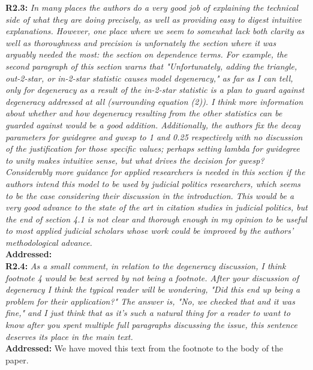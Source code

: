 \documentclass[a4paper,11pt]{texMemo}
\begin{document}
\noindent \textbf{R2.3:} \emph{ In many places the authors do a very good job of explaining the technical side of what they are doing precisely, as well as providing easy to digest intuitive explanations. However, one place where we seem to somewhat lack both clarity as well as thoroughness and precision is unfornately the section where it was arguably needed the most: the section on dependence terms. For example, the second paragraph of this section warns that "Unfortunately, adding the triangle, out-2-star, or in-2-star statistic causes model degeneracy," as far as I can tell, only for degeneracy as a result of the in-2-star statistic is a plan to guard against degeneracy addressed at all (surrounding equation (2)). I think more information about whether and how degeneracy resulting from the other statistics can be guarded against would be a good addition. Additionally, the authors fix the decay parameters for gwidegree and gwesp to 1 and 0.25 respectively with no discussion of the justification for those specific values; perhaps setting lambda for gwidegree to unity makes intuitive sense, but what drives the decision for gwesp? Considerably more guidance for applied researchers is needed in this section if the authors intend this model to be used by judicial politics researchers, which seems to be the case considering their discussion in the introduction. This would be a very good advance to the state of the art in citation studies in judicial politics, but the end of section 4.1 is not clear and thorough enough in my opinion to be useful to most applied judicial scholars whose work could be improved by the authors' methodological advance.}\\

\noindent \textbf{Addressed:}  \\

\noindent \textbf{R2.4:} \emph{ As a small comment, in relation to the degeneracy discussion, I think footnote 4 would be best served by not being a footnote. After your discussion of degeneracy I think the typical reader will be wondering, "Did this end up being a problem for their application?" The answer is, "No, we checked that and it was fine," and I just think that as it's such a natural thing for a reader to want to know after you spent multiple full paragraphs discussing the issue, this sentence deserves its place in the main text.}\\

\noindent \textbf{Addressed:}  We have moved this text from the footnote to the body of the paper.\\
\end{document}
